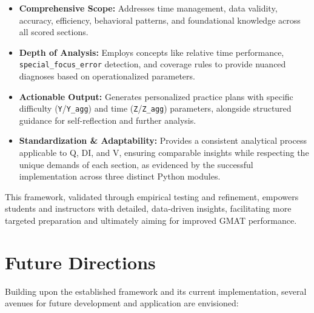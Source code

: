 \documentclass{article}
\begin{document}
\begin{itemize}
    \item \textbf{Comprehensive Scope:} Addresses time management, data validity, accuracy, efficiency, behavioral patterns, and foundational knowledge across all scored sections.
    \item \textbf{Depth of Analysis:} Employs concepts like relative time performance, \texttt{special\_focus\_error} detection, and coverage rules to provide nuanced diagnoses based on operationalized parameters.
    \item \textbf{Actionable Output:} Generates personalized practice plans with specific difficulty (\texttt{Y}/\texttt{Y\_agg}) and time (\texttt{Z}/\texttt{Z\_agg}) parameters, alongside structured guidance for self-reflection and further analysis.
    \item \textbf{Standardization \& Adaptability:} Provides a consistent analytical process applicable to Q, DI, and V, ensuring comparable insights while respecting the unique demands of each section, as evidenced by the successful implementation across three distinct Python modules.
\end{itemize}

This framework, validated through empirical testing and refinement, empowers students and instructors with detailed, data-driven insights, facilitating more targeted preparation and ultimately aiming for improved GMAT performance.

\section{Future Directions}

Building upon the established framework and its current implementation, several avenues for future development and application are envisioned:
\end{document}

